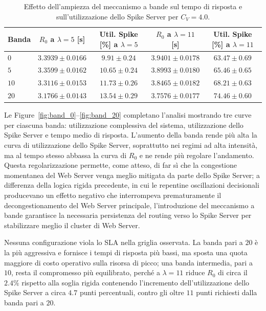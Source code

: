 ﻿\documentclass[a4paper,12pt]{article}
\begin{document}
\begin{table}[H]
    \centering
    \small
    \renewcommand{\arraystretch}{1.3}
    \begin{tabular}{lcccc}
        \hline
        \textbf{Banda} & \textbf{$R_0$ a $\lambda=5$ [s]} & \textbf{Util. Spike [\%] a $\lambda=5$} & \textbf{$R_0$ a $\lambda=11$ [s]} & \textbf{Util. Spike [\%] a $\lambda=11$} \\ \hline
        $0$  & $3.3939 \pm 0.0166$ & $9.91 \pm 0.24$  & $3.9401 \pm 0.0178$ & $63.47 \pm 0.69$ \\
        $5$  & $3.3599 \pm 0.0162$ & $10.65 \pm 0.24$ & $3.8993 \pm 0.0180$ & $65.46 \pm 0.65$ \\
        $10$ & $3.3116 \pm 0.0153$ & $11.73 \pm 0.26$ & $3.8465 \pm 0.0182$ & $68.21 \pm 0.63$ \\
        $20$ & $3.1766 \pm 0.0143$ & $13.54 \pm 0.29$ & $3.7576 \pm 0.0177$ & $74.46 \pm 0.60$ \\ \hline
    \end{tabular}
    \caption{Effetto dell'ampiezza del meccanismo a bande sul tempo di risposta e sull'utilizzazione dello Spike Server per $C_V=4.0$.}
    \label{tab:band_results}
\end{table}

Le Figure~\ref{fig:band_0}--\ref{fig:band_20} completano l'analisi mostrando tre curve per ciascuna banda: utilizzazione complessiva del sistema, utilizzazione dello Spike Server e tempo medio di risposta. L'aumento della banda rende più alta la curva di utilizzazione dello Spike Server, soprattutto nei regimi ad alta intensità, ma al tempo stesso abbassa la curva di $R_0$ e ne rende più regolare l'andamento. Questa regolarizzazione permette, come atteso, di far sì che la congestione momentanea del Web Server venga meglio mitigata da parte dello Spike Server; a differenza della logica rigida precedente, in cui le repentine oscillazioni decisionali producevano un effetto negativo che interrompeva prematuramente il decongestionamento del Web Server principale, l'introduzione del meccanismo a bande garantisce la necessaria persistenza del routing verso lo Spike Server per stabilizzare meglio il cluster di Web Server.

Nessuna configurazione viola lo SLA nella griglia osservata. La banda pari a $20$ è la più aggressiva e fornisce i tempi di risposta più bassi, ma sposta una quota maggiore di costo operativo sulla risorsa di picco; una banda intermedia, pari a $10$, resta il compromesso più equilibrato, perché a $\lambda=11$ riduce $R_0$ di circa il $2.4\%$ rispetto alla soglia rigida contenendo l'incremento dell'utilizzazione dello Spike Server a circa $4.7$ punti percentuali, contro gli oltre $11$ punti richiesti dalla banda pari a $20$.
\end{document}
